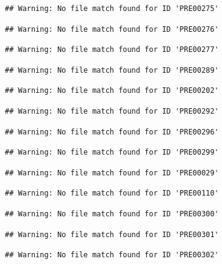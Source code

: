 \documentclass[
]{book}
\theoremstyle{definition}
\theoremstyle{definition}
\theoremstyle{definition}
\theoremstyle{definition}
\theoremstyle{remark}
\begin{document}
\begin{verbatim}
## Warning: No file match found for ID 'PRE00275'
\end{verbatim}

\begin{verbatim}
## Warning: No file match found for ID 'PRE00276'
\end{verbatim}

\begin{verbatim}
## Warning: No file match found for ID 'PRE00277'
\end{verbatim}

\begin{verbatim}
## Warning: No file match found for ID 'PRE00289'
\end{verbatim}

\begin{verbatim}
## Warning: No file match found for ID 'PRE00202'
\end{verbatim}

\begin{verbatim}
## Warning: No file match found for ID 'PRE00292'
\end{verbatim}

\begin{verbatim}
## Warning: No file match found for ID 'PRE00296'
\end{verbatim}

\begin{verbatim}
## Warning: No file match found for ID 'PRE00299'
\end{verbatim}

\begin{verbatim}
## Warning: No file match found for ID 'PRE00029'
\end{verbatim}

\begin{verbatim}
## Warning: No file match found for ID 'PRE00110'
\end{verbatim}

\begin{verbatim}
## Warning: No file match found for ID 'PRE00300'
\end{verbatim}

\begin{verbatim}
## Warning: No file match found for ID 'PRE00301'
\end{verbatim}

\begin{verbatim}
## Warning: No file match found for ID 'PRE00302'
\end{verbatim}
\end{document}
